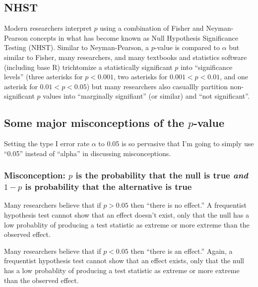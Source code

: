 \documentclass[]{book}
\begin{document}
\subsection{NHST}\label{nhst}

Modern researchers interpret \(p\) using a combination of Fisher and
Neyman-Pearson concepts in what has become known as Null Hypothesis
Significance Testing (NHST). Similar to Neyman-Pearson, a \(p\)-value is
compared to \(\alpha\) but similar to Fisher, many researchers, and many
textbooks and statistics software (including base R) trichtomize a
statistically significant \(p\) into ``significance levels'' (three
asterisks for \(p < 0.001\), two asterisks for \(0.001 < p < 0.01\), and
one asterisk for \(0.01 < p < 0.05\)) but many researchers also
casuallly partition non-significant \(p\) values into ``marginally
signifiant'' (or similar) and ``not significant''.

\subsection{\texorpdfstring{Some major misconceptions of the
\(p\)-value}{Some major misconceptions of the p-value}}\label{some-major-misconceptions-of-the-p-value}

Setting the type I error rate \(\alpha\) to 0.05 is so pervasive that
I'm going to simply use ``0.05'' instead of ``alpha'' in discussing
misconceptions.

\subsubsection{\texorpdfstring{Misconception: \(p\) is the probability
that the null is true \emph{and} \(1-p\) is probability that the
alternative is
true}{Misconception: p is the probability that the null is true and 1-p is probability that the alternative is true}}\label{misconception-p-is-the-probability-that-the-null-is-true-and-1-p-is-probability-that-the-alternative-is-true}

Many researchers believe that if \(p > 0.05\) then ``there is no
effect.'' A frequentist hypothesis test cannot show that an effect
doesn't exist, only that the null has a low probablity of producing a
test statistic as extreme or more extreme than the observed effect.

Many researchers believe that if \(p < 0.05\) then ``there is an
effect.'' Again, a frequentist hypothesis test cannot show that an
effect exists, only that the null has a low probablity of producing a
test statistic as extreme or more extreme than the observed effect.
\end{document}
